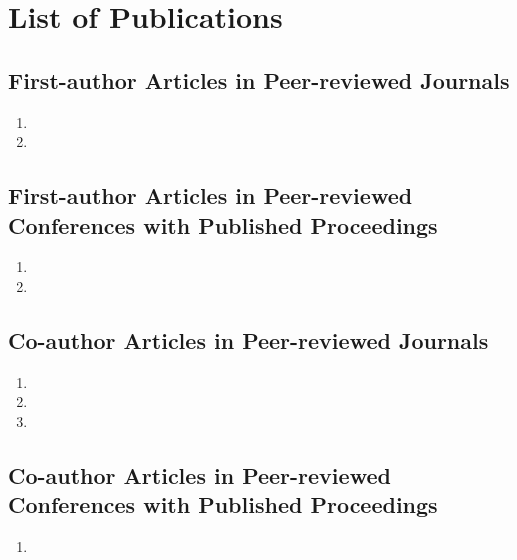 \chapter{List of Publications}

\section*{First-author Articles in Peer-reviewed Journals} %
\label{sec:first_author_journal_articles}
\begin{enumerate}
    \item {}
    \item {} %
\end{enumerate}

\section*{First-author Articles in Peer-reviewed Conferences with Published Proceedings}
\label{sec:first_author_peer_reviewed_conference_papers}
\begin{enumerate}
    \item {}
    \item {}
\end{enumerate}

\section*{Co-author Articles in Peer-reviewed Journals} %
\label{sec:journal_articles}
\begin{enumerate}
    \item {}
    \item {}
    \item {}
\end{enumerate}

\section*{Co-author Articles in Peer-reviewed Conferences with Published Proceedings}
\label{sec:peer_reviewed_conference_papers}
\begin{enumerate}
    \item {}
\end{enumerate}
